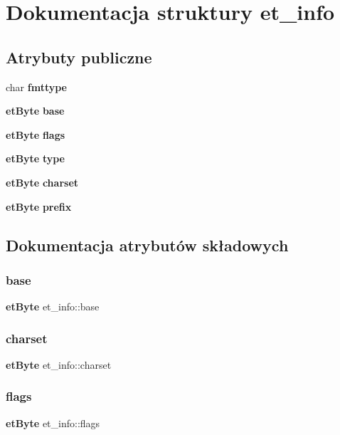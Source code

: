 \section{Dokumentacja struktury et\+\_\+info}
\label{structet__info}
\subsection*{Atrybuty publiczne}
\begin{DoxyCompactItemize}
\item 
char \textbf{ fmttype}
\item 
\textbf{ et\+Byte} \textbf{ base}
\item 
\textbf{ et\+Byte} \textbf{ flags}
\item 
\textbf{ et\+Byte} \textbf{ type}
\item 
\textbf{ et\+Byte} \textbf{ charset}
\item 
\textbf{ et\+Byte} \textbf{ prefix}
\end{DoxyCompactItemize}


\subsection{Dokumentacja atrybutów składowych}
\mbox{\label{structet__info_a20f5a4c11c7aa1d9c777805d11965c66}} 
\subsubsection{base}
{\footnotesize\ttfamily \textbf{ et\+Byte} et\+\_\+info\+::base}

\mbox{\label{structet__info_a77131acb7479b0e6aad61af0901e11c2}} 
\subsubsection{charset}
{\footnotesize\ttfamily \textbf{ et\+Byte} et\+\_\+info\+::charset}

\mbox{\label{structet__info_a8f11646aaec803f0870683dc3ba2f756}} 
\subsubsection{flags}
{\footnotesize\ttfamily \textbf{ et\+Byte} et\+\_\+info\+::flags}

